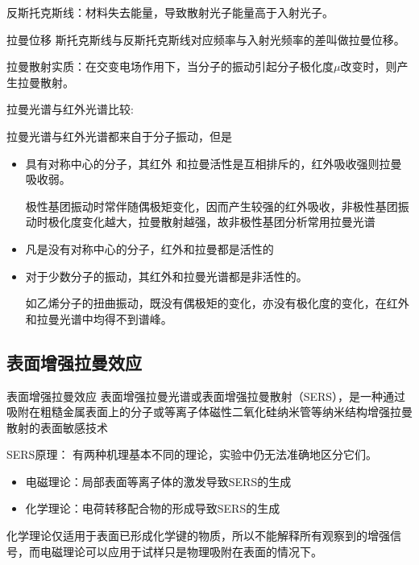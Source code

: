 反斯托克斯线：材料失去能量，导致散射光子能量高于入射光子。
\begin{definition*}{拉曼位移}
	斯托克斯线与反斯托克斯线对应频率与入射光频率的差叫做拉曼位移。
\end{definition*}

拉曼散射实质：在交变电场作用下，当分子的振动引起分子极化度$\mu$改变时，则产生拉曼散射。

\begin{note}

	拉曼光谱与红外光谱比较:
	
	拉曼光谱与红外光谱都来自于分子振动，但是
	\begin{itemize}
		\item 具有对称中心的分子，其红外	和拉曼活性是互相排斥的，红外吸收强则拉曼吸收弱。         \begin{example}
			极性基团振动时常伴随偶极矩变化，因而产生较强的红外吸收，非极性基团振动时极化度变化越大，拉曼散射越强，故非极性基团分析常用拉曼光谱
		\end{example}
		\item 凡是没有对称中心的分子，红外和拉曼都是活性的
		\item 对于少数分子的振动，其红外和拉曼光谱都是非活性的。
		\begin{example}
			如乙烯分子的扭曲振动，既没有偶极矩的变化，亦没有极化度的变化，在红外和拉曼光谱中均得不到谱峰。
		\end{example}
	\end{itemize}

\end{note}

\subsection{表面增强拉曼效应}
\begin{definition*}{表面增强拉曼效应}
	表面增强拉曼光谱或表面增强拉曼散射（SERS），是一种通过吸附在粗糙金属表面上的分子或等离子体磁性二氧化硅纳米管等纳米结构增强拉曼散射的表面敏感技术
\end{definition*}

SERS原理：
有两种机理基本不同的理论，实验中仍无法准确地区分它们。
\begin{itemize}
	\item 电磁理论：局部表面等离子体的激发导致SERS的生成
	\item 化学理论：电荷转移配合物的形成导致SERS的生成
\end{itemize}
\begin{note}
	化学理论仅适用于表面已形成化学键的物质，所以不能解释所有观察到的增强信号，而电磁理论可以应用于试样只是物理吸附在表面的情况下。
\end{note}

